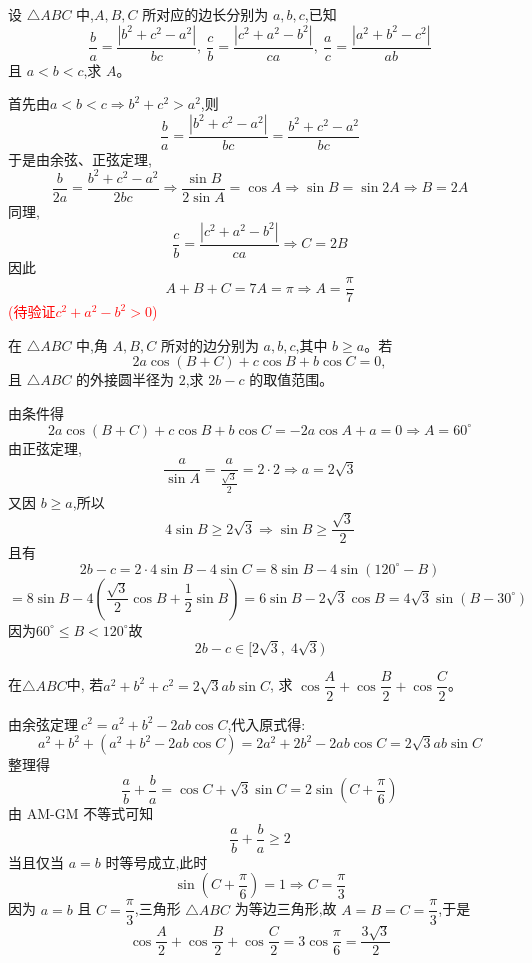 \begin{questions}
    \question 设 $\triangle ABC$ 中,$A,B,C$ 所对应的边长分别为 $a,b,c$,已知 \[\frac{b}{a}=\frac{|b^2+c^2-a^2|}{bc},\ \frac{c}{b}=\frac{|c^2+a^2-b^2|}{ca},\ \frac{a}{c}=\frac{|a^2+b^2-c^2|}{ab}\] 且 $a<b<c$,求 $A$。
    \begin{solution}
        首先由$a<b<c \Rightarrow b^2+c^2>a^2$,则
        \[
        \frac{b}{a} = \frac{|b^2+c^2-a^2|}{bc} = \frac{b^2+c^2-a^2}{bc} 
        \]
        于是由余弦、正弦定理,
        \[
        \frac{b}{2a} = \frac{b^2+c^2-a^2}{2bc} \Rightarrow \frac{\sin B}{2\sin A} = \cos A \Rightarrow \sin B = \sin2A \Rightarrow B = 2 A
        \]
        同理,
        \[
        \frac{c}{b} = \frac{|c^2+a^2-b^2|}{ca} \Rightarrow C = 2 B
        \]
        因此
        \[
        A +  B +  C =  7 A = \pi \Rightarrow A = \frac{\pi}{7}
        \]
        \textcolor{red}{(待验证$c^2+a^2-b^2>0$)}
    \end{solution}

    \question 在 $\triangle ABC$ 中,角 $A,B,C$ 所对的边分别为 $a,b,c$,其中 $b \ge a$。若 
    \[
    2a\cos(B+C)+c\cos B+b\cos C=0,
    \] 
    且 $\triangle ABC$ 的外接圆半径为 $2$,求 $2b - c$ 的取值范围。
    \begin{solution}
        由条件得
        \[
        2a\cos(B+C)+c\cos B+b\cos C = -2a\cos A + a = 0 \Rightarrow A = 60^\circ
        \]
        由正弦定理,
        \[
        \frac{a}{\sin A} = \frac{a}{\frac{\sqrt{3}}{2}} = 2 \cdot 2 \Rightarrow a = 2\sqrt{3}
        \]
        又因 $b \ge a$,所以
        \[
        4\sin B \ge 2\sqrt{3} \Rightarrow \sin B \ge \frac{\sqrt{3}}{2}
        \]
        且有
        \[
        2b - c = 2 \cdot 4\sin B - 4\sin C = 8\sin B - 4\sin(120^\circ - B)
        \]
        \[
        = 8\sin B - 4\left(\frac{\sqrt{3}}{2}\cos B + \frac{1}{2}\sin B\right)
        = 6\sin B - 2\sqrt{3}\cos B
        = 4\sqrt{3}\sin(B - 30^\circ)
        \]
        因为$60^\circ \le B < 120^\circ$故
        \[2b - c \in {[2\sqrt{3},\; 4\sqrt{3})}
        \]
    \end{solution}

    \question 在$\triangle ABC$中, 若$a^{2}+b^{2}+c^{2}=2\sqrt{3}ab\sin C$, 求 $\cos\dfrac{A}{2}+\cos\dfrac{B}{2}+\cos\dfrac{C}{2}$。
    \begin{solution}
        由余弦定理$\ c^2 = a^2 + b^2 - 2ab\cos C$,代入原式得:
        \[
        a^2 + b^2 + (a^2 + b^2 - 2ab\cos C) =2a^2 + 2b^2 - 2ab\cos C= 2\sqrt{3}ab\sin C
        \]
        整理得
        \[
        \frac{a}{b} + \frac{b}{a} = \cos C + \sqrt{3}\sin C =2\sin\left(C + \frac{\pi}{6}\right)
        \]
        由 AM-GM 不等式可知
        \[
        \frac{a}{b} + \frac{b}{a} \ge 2
        \]
        当且仅当 $a = b$ 时等号成立,此时
        \[
        \sin\left(C + \frac{\pi}{6}\right) = 1 \Rightarrow C = \frac{\pi}{3}
        \]
        因为 $a = b$ 且 $C = \dfrac{\pi}{3}$,三角形 $\triangle ABC$ 为等边三角形,故 $A = B = C = \dfrac{\pi}{3}$,于是
        \[
        \cos\frac{A}{2} + \cos\frac{B}{2} + \cos\frac{C}{2} = 3\cos\frac{\pi}{6} = \frac{3\sqrt{3}}{2}
        \]
    \end{solution}


\end{questions}
